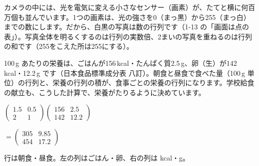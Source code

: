 \begin{butsuri}
\noindent\begin{minipage}[c]{0.66\linewidth}
\raggedright
カメラの中には、光を電気に変える小さなセンサー（画素）が、たてと横に何百万個も並んでいます。1つの画素は、光の強さを0（まっ黒）から255（まっ白）までの数にします。だから、白黒の写真は数の行列です（1-13 の「画面は点の表」）。写真全体を明るくするのは行列の実数倍、2まいの写真を重ねるのは行列の和です（255をこえた所は255にする）。
\end{minipage}\hfill
\begin{minipage}[c]{0.31\linewidth}
\centering
{}
\end{minipage}
\end{butsuri}

\begin{butsuri}
\noindent\begin{minipage}[c]{0.56\linewidth}
\raggedright
100\,g あたりの栄養は、ごはんが156\,kcal・たんぱく質2.5\,g、卵（生）が142\,kcal・12.2\,g です（日本食品標準成分表 八訂）。朝食と昼食で食べた量（100\,g 単位）の行列と、栄養の行列の積が、食事ごとの栄養の行列になります。学校給食の献立も、こうした計算で、栄養がたりるように決めています。
\end{minipage}\hfill
\begin{minipage}[c]{0.41\linewidth}
\centering
$\begin{pmatrix} 1.5 & 0.5\\ 2 & 1 \end{pmatrix}\begin{pmatrix} 156 & 2.5\\ 142 & 12.2 \end{pmatrix}$\par\vspace{2pt}
$=\begin{pmatrix} 305 & 9.85\\ 454 & 17.2 \end{pmatrix}$\par\vspace{3pt}
{\footnotesize 行は朝食・昼食。左の列はごはん・卵、右の列は kcal・g。}
\end{minipage}
\end{butsuri}

